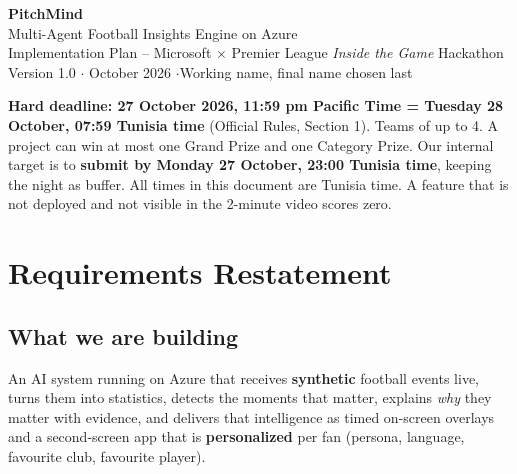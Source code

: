 \documentclass[11pt,a4paper]{article}
\newcommand{\hi}[1]{\textbf{\color{pmblue}#1}}
\begin{document}
\sloppy

\begin{center}
  {\Huge\bfseries\color{pmblue} PitchMind}\\[4pt]
  {\large Multi-Agent Football Insights Engine on Azure}\\[2pt]
  {\normalsize Implementation Plan -- Microsoft $\times$ Premier League \emph{Inside the Game} Hackathon}\\[8pt]
  {\small Version 1.0 \quad$\cdot$ October 2026 \quad$\cdot$\quad Working name, final name chosen last}
\end{center}

\vspace{4pt}
\noindent\colorbox{pmred!10}{\parbox{\dimexpr\linewidth-2\fboxsep}{%
\textbf{\color{pmred}Hard deadline: 27 October 2026, 11:59 pm Pacific Time = Tuesday 28 October, 07:59 Tunisia time}
(Official Rules, Section 1). Teams of up to 4. A project can win at most one Grand Prize and one Category Prize.
Our internal target is to \textbf{submit by Monday 27 October, 23:00 Tunisia time}, keeping the night as buffer. All times in this
document are Tunisia time. A feature that is not deployed and not visible in the 2-minute video scores zero.}}

\tableofcontents
\newpage

\section{Requirements Restatement}

\subsection{What we are building}
An AI system running on Azure that receives \hi{synthetic} football events live, turns them into
statistics, detects the moments that matter, explains \emph{why} they matter with evidence, and
delivers that intelligence as timed on-screen overlays and a second-screen app that is
\hi{personalized} per fan (persona, language, favourite club, favourite player).
\end{document}
